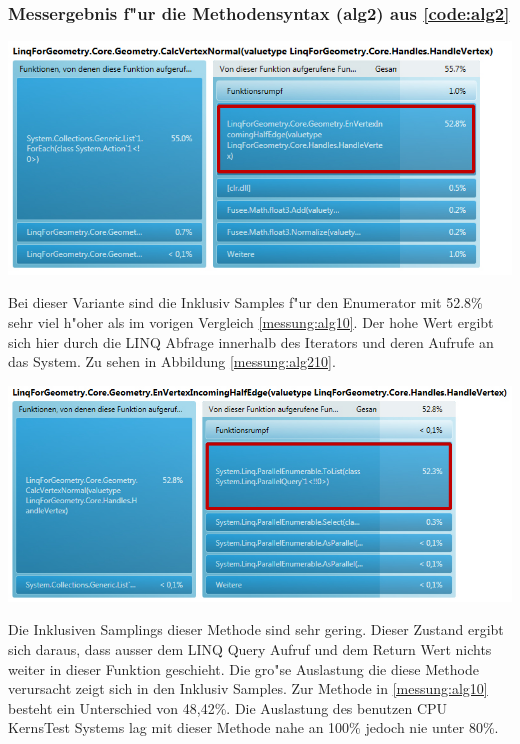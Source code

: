 \documentclass[pagesize, paper=a4, fontsize=12pt,titlepage=true, headings=small, headnosepline, abstractoff, liststotoc, nochapterprefix, plainheadsepline]{scrreprt}
\begin{document}
\subsubsection{Messergebnis f"ur die Methodensyntax (alg2) aus \ref{code:alg2}}
\begin{minipage}[c][8cm]{\linewidth}
\includegraphics[width=\linewidth]{../Messung/2-linq-calcvertnormals-1}
\label{messung:alg20}
\end{minipage}
Bei dieser Variante sind die Inklusiv Samples f"ur den Enumerator mit 52.8\% sehr viel h"oher als im vorigen Vergleich \ref{messung:alg10}. Der hohe Wert ergibt sich hier durch die LINQ Abfrage innerhalb des Iterators und deren Aufrufe an das System. Zu sehen in Abbildung \ref{messung:alg210}.

\begin{minipage}[c][8.5cm]{\linewidth}
\includegraphics[width=\linewidth]{../Messung/2-linq-envertexinche-1-0}
\label{messung:alg210}
\end{minipage}
Die Inklusiven Samplings dieser Methode sind sehr gering. Dieser Zustand ergibt sich daraus, dass ausser dem LINQ Query Aufruf und dem Return Wert nichts weiter in dieser Funktion geschieht. Die gro"se Auslastung die diese Methode verursacht zeigt sich in den Inklusiv Samples. Zur Methode in \ref{messung:alg10} besteht ein Unterschied von 48,42\%. Die Auslastung des benutzen CPU KernsTest Systems lag mit dieser Methode nahe an 100\% jedoch nie unter 80\%.
\end{document}
